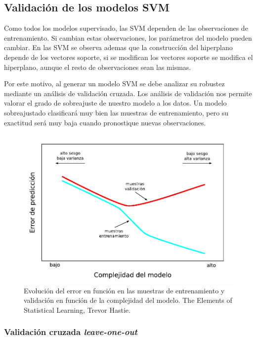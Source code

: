 \documentclass[12pt,spanish,a4paper]{article}
\numberwithin{equation}{section}
\begin{document}
\clearpage

\subsection{Validación de los modelos
SVM}\label{validacion-de-los-modelos-svm}

Como todos los modelos supervisado, las SVM dependen de las
observaciones de entrenamiento. Si cambian estas observaciones, los
parámetros del modelo pueden cambiar. En las SVM se observa ademas que
la construcción del hiperplano depende de los vectores soporte, si se
modifican los vectores soporte se modifica el hiperplano, aunque el
resto de observaciones sean las mismas.

Por este motivo, al generar un modelo SVM se debe analizar su robustez
mediante un análisis de validación cruzada. Los análisis de validación
nos permite valorar el grado de sobreajuste de nuestro modelo a los
datos. Un modelo sobreajustado clasificará muy bien las muestras de
entrenamiento, pero su exactitud será muy baja cuando pronostique nuevas
observaciones.

\begin{figure}[h]
\begin{center}
\includegraphics[width=0.9\linewidth]{./figures/complejidad_modelo.pdf}
\caption{Evolución del error en función en las muestras de entrenamiento y validación en función de la complejidad del modelo. The Elements of Statistical Learning, Trevor Hastie.}
\label{fig:complejidad_modelo}
\end{center}
\end{figure}

\subsubsection{\texorpdfstring{Validación cruzada
\emph{leave-one-out}}{Validación cruzada leave-one-out}}\label{validacion-cruzada-leave-one-out}
\end{document}
